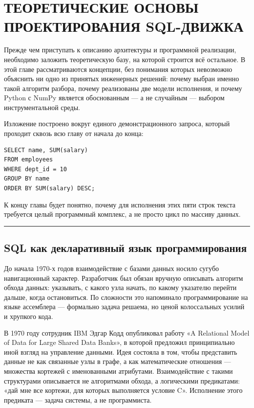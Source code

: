 \documentclass[a4paper,12pt]{report}
\begin{document}
\chapter{ТЕОРЕТИЧЕСКИЕ ОСНОВЫ ПРОЕКТИРОВАНИЯ SQL-ДВИЖКА}

Прежде чем приступать к описанию архитектуры и программной реализации, необходимо заложить теоретическую базу, на которой строится всё остальное. В этой главе рассматриваются концепции, без понимания которых невозможно объяснить ни одно из принятых инженерных решений: почему выбран именно такой алгоритм разбора, почему реализованы две модели исполнения, и почему Python с NumPy является обоснованным — а не случайным — выбором инструментальной среды.

Изложение построено вокруг единого демонстрационного запроса, который проходит сквозь всю главу от начала до конца:

\begin{verbatim}
SELECT name, SUM(salary)
FROM employees
WHERE dept_id = 10
GROUP BY name
ORDER BY SUM(salary) DESC;
\end{verbatim}

К концу главы будет понятно, почему для исполнения этих пяти строк текста требуется целый программный комплекс, а не просто цикл по массиву данных.

\vspace{0.5cm}\hrule\vspace{0.5cm}

\section{SQL как декларативный язык программирования}

До начала 1970-х годов взаимодействие с базами данных носило сугубо навигационный характер. Разработчик был обязан вручную описывать алгоритм обхода данных: указывать, с какого узла начать, по какому указателю перейти дальше, когда остановиться. По сложности это напоминало программирование на языке ассемблера — формально задача решаема, но ценой колоссальных усилий и хрупкого кода.

В 1970 году сотрудник IBM Эдгар Кодд опубликовал работу «A Relational Model of Data for Large Shared Data Banks», в которой предложил принципиально иной взгляд на управление данными. Идея состояла в том, чтобы представить данные не как связанные узлы в графе, а как математические отношения — множества кортежей с именованными атрибутами. Взаимодействие с такими структурами описывается не алгоритмами обхода, а логическими предикатами: «дай мне все кортежи, для которых выполняется условие C». Исполнение этого предиката — задача системы, а не программиста.
\end{document}
